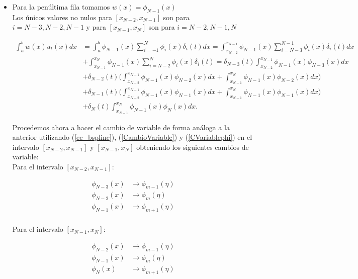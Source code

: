 \begin{itemize}
    \item Para la penúltima fila tomamos $w(x)=\phi_{N-1}(x)$\\
    
    Los únicos valores no nulos para $[x_{N-2},x_{N-1}]$ son para $i=N-3,N-2,N-1$ y para  $[x_{N-1},x_{N}]$ son para $i=N-2,N-1,N$

\begin{equation}
\label{wphiN-1}
\begin{split}
    \int_{a}^{b}w(x)u_{t}(x)dx& =\int_{a}^{b}\phi_{N-1}(x)\sum_{i=-1}^{N}\phi_{i}(x)\delta_{i}(t) dx=\int_{x_{N-2}}^{x_{N-1}}\phi_{N-1}(x)\sum_{i=N-3}^{N-1}\phi_{i}(x)\delta_{i}(t)dx\\
    & +\int_{x_{N-1}}^{x_{N}}\phi_{N-1}(x)\sum_{i=N-2}^{N}\phi_{i}(x)\delta_{i}(t)=\delta_{N-3}(t)\int_{x_{N-2}}^{x_{N-1}}\phi_{N-1}(x)\phi_{N-3}(x)dx\\
    & +\delta_{N-2}(t)\Bigg(\int_{x_{N-2}}^{x_{N-1}}\phi_{N-1}(x)\phi_{N-2}(x)dx+\int_{x_{N-1}}^{x_{N}}\phi_{N-1}(x)\phi_{N-2}(x)dx\Bigg)\\
    & +\delta_{N-1}(t)\Bigg(\int_{x_{N-2}}^{x_{N-1}}\phi_{N-1}(x)\phi_{N-1}(x)dx+\int_{x_{N-1}}^{x_{N}}\phi_{N-1}(x)\phi_{N-1}(x)dx\Bigg)\\
    & +\delta_{N}(t)\int_{x_{N-1}}^{x_{N}}\phi_{N-1}(x)\phi_{N}(x)dx.
    \end{split}
\end{equation}
    

Procedemos ahora a hacer el cambio de variable de forma análoga a la anterior utilizando (\ref{ec_bspline}), (\ref{CambioVariable})  y (\ref{CVariablephi}) en el intervalo $[x_{N-2},x_{N-1}]$ y $[x_{N-1},x_{N}]$  obteniendo los siguientes cambios de variable:\\

Para el intervalo $[x_{N-2},x_{N-1}]$:

\begin{align*}
    \phi_{N-3}(x) & \rightarrow \phi_{m-1}(\eta)\\
    \phi_{N-2}(x) & \rightarrow \phi_{m}(\eta)\\
    \phi_{N-1}(x) & \rightarrow \phi_{m+1}(\eta)\\
\end{align*}

Para el intervalo $[x_{N-1},x_{N}]$:

\begin{align*}
    \phi_{N-2}(x) & \rightarrow \phi_{m-1}(\eta)\\
    \phi_{N-1}(x) &\rightarrow \phi_{m}(\eta)\\
    \phi_{N}(x) &\rightarrow \phi_{m+1}(\eta)\\
\end{align*}


\end{itemize}
